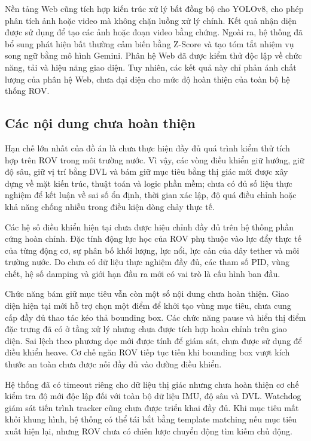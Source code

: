 \documentclass[../DoAn.tex]{subfiles}
\begin{document}
Nền tảng Web cũng tích hợp kiến trúc xử lý bất đồng bộ cho YOLOv8, cho phép phân tích ảnh hoặc video mà không chặn luồng xử lý chính. Kết quả nhận diện được sử dụng để tạo các ảnh hoặc đoạn video bằng chứng. Ngoài ra, hệ thống đã bổ sung phát hiện bất thường cảm biến bằng Z-Score và tạo tóm tắt nhiệm vụ song ngữ bằng mô hình Gemini. Phân hệ Web đã được kiểm thử độc lập về chức năng, tải và hiệu năng giao diện. Tuy nhiên, các kết quả này chỉ phản ánh chất lượng của phân hệ Web, chưa đại diện cho mức độ hoàn thiện của toàn bộ hệ thống ROV.

\subsection{Các nội dung chưa hoàn thiện}

Hạn chế lớn nhất của đồ án là chưa thực hiện đầy đủ quá trình kiểm thử tích hợp trên ROV trong môi trường nước. Vì vậy, các vòng điều khiển giữ hướng, giữ độ sâu, giữ vị trí bằng DVL và bám giữ mục tiêu bằng thị giác mới được xây dựng về mặt kiến trúc, thuật toán và logic phần mềm; chưa có đủ số liệu thực nghiệm để kết luận về sai số ổn định, thời gian xác lập, độ quá điều chỉnh hoặc khả năng chống nhiễu trong điều kiện dòng chảy thực tế.

Các hệ số điều khiển hiện tại chưa được hiệu chỉnh đầy đủ trên hệ thống phần cứng hoàn chỉnh. Đặc tính động lực học của ROV phụ thuộc vào lực đẩy thực tế của từng động cơ, sự phân bố khối lượng, lực nổi, lực cản của dây tether và môi trường nước. Do chưa có dữ liệu thực nghiệm đầy đủ, các tham số PID, vùng chết, hệ số damping và giới hạn đầu ra mới có vai trò là cấu hình ban đầu.

Chức năng bám giữ mục tiêu vẫn còn một số nội dung chưa hoàn thiện. Giao diện hiện tại mới hỗ trợ chọn một điểm để khởi tạo vùng mục tiêu, chưa cung cấp đầy đủ thao tác kéo thả bounding box. Các chức năng pause và hiển thị điểm đặc trưng đã có ở tầng xử lý nhưng chưa được tích hợp hoàn chỉnh trên giao diện. Sai lệch theo phương dọc mới được tính để giám sát, chưa được sử dụng để điều khiển heave. Cơ chế ngăn ROV tiếp tục tiến khi bounding box vượt kích thước an toàn chưa được nối đầy đủ vào đường điều khiển.

Hệ thống đã có timeout riêng cho dữ liệu thị giác nhưng chưa hoàn thiện cơ chế kiểm tra độ mới độc lập đối với toàn bộ dữ liệu IMU, độ sâu và DVL. Watchdog giám sát tiến trình tracker cũng chưa được triển khai đầy đủ. Khi mục tiêu mất khỏi khung hình, hệ thống có thể tái bắt bằng template matching nếu mục tiêu xuất hiện lại, nhưng ROV chưa có chiến lược chuyển động tìm kiếm chủ động.
\end{document}
